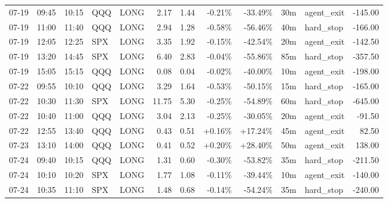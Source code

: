\documentclass[11pt,a4paper,twoside]{article}
\begin{document}
\begin{center}
\begin{longtable}{>{\color{txtmain}}l l l l l r r r r r >{\color{txtmain}}l r}
07-19 & 09:45 & 10:15 & QQQ & LONG & 2.17 & 1.44 & \textcolor{lossred}{-0.21\%} & \textcolor{lossred}{-33.49\%} & 30m & agent\_exit & \textcolor{lossred}{-145.00} \\
07-19 & 11:00 & 11:40 & QQQ & LONG & 2.94 & 1.28 & \textcolor{lossred}{-0.58\%} & \textcolor{lossred}{-56.46\%} & 40m & hard\_stop & \textcolor{lossred}{-166.00} \\
07-19 & 12:05 & 12:25 & SPX & LONG & 3.35 & 1.92 & \textcolor{lossred}{-0.15\%} & \textcolor{lossred}{-42.54\%} & 20m & agent\_exit & \textcolor{lossred}{-142.50} \\
07-19 & 13:20 & 14:45 & SPX & LONG & 6.40 & 2.83 & \textcolor{lossred}{-0.04\%} & \textcolor{lossred}{-55.86\%} & 85m & hard\_stop & \textcolor{lossred}{-357.50} \\
07-19 & 15:05 & 15:15 & QQQ & LONG & 0.08 & 0.04 & \textcolor{lossred}{-0.02\%} & \textcolor{lossred}{-40.00\%} & 10m & agent\_exit & \textcolor{lossred}{-198.00} \\
07-22 & 09:55 & 10:10 & QQQ & LONG & 3.29 & 1.64 & \textcolor{lossred}{-0.53\%} & \textcolor{lossred}{-50.15\%} & 15m & hard\_stop & \textcolor{lossred}{-165.00} \\
07-22 & 10:30 & 11:30 & SPX & LONG & 11.75 & 5.30 & \textcolor{lossred}{-0.25\%} & \textcolor{lossred}{-54.89\%} & 60m & hard\_stop & \textcolor{lossred}{-645.00} \\
07-22 & 10:40 & 11:00 & QQQ & LONG & 3.04 & 2.13 & \textcolor{lossred}{-0.25\%} & \textcolor{lossred}{-30.05\%} & 20m & agent\_exit & \textcolor{lossred}{-91.50} \\
07-22 & 12:55 & 13:40 & QQQ & LONG & 0.43 & 0.51 & \textcolor{wingreen}{+0.16\%} & \textcolor{wingreen}{+17.24\%} & 45m & agent\_exit & \textcolor{wingreen}{82.50} \\
07-23 & 13:10 & 14:00 & QQQ & LONG & 0.41 & 0.52 & \textcolor{wingreen}{+0.20\%} & \textcolor{wingreen}{+28.40\%} & 50m & agent\_exit & \textcolor{wingreen}{138.00} \\
07-24 & 09:40 & 10:15 & QQQ & LONG & 1.31 & 0.60 & \textcolor{lossred}{-0.30\%} & \textcolor{lossred}{-53.82\%} & 35m & hard\_stop & \textcolor{lossred}{-211.50} \\
07-24 & 10:10 & 10:20 & SPX & LONG & 1.77 & 1.08 & \textcolor{lossred}{-0.11\%} & \textcolor{lossred}{-39.44\%} & 10m & agent\_exit & \textcolor{lossred}{-140.00} \\
07-24 & 10:35 & 11:10 & SPX & LONG & 1.48 & 0.68 & \textcolor{lossred}{-0.14\%} & \textcolor{lossred}{-54.24\%} & 35m & hard\_stop & \textcolor{lossred}{-240.00} \\

\end{longtable}
\end{center}
\end{document}
